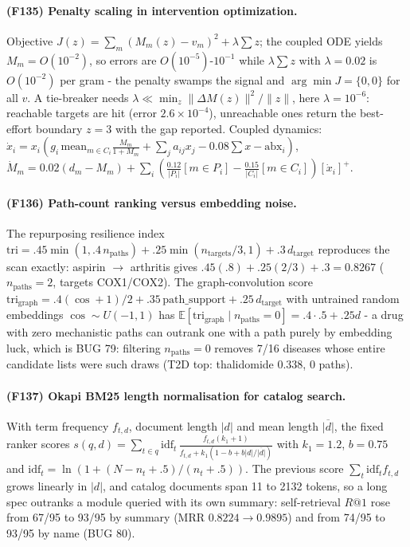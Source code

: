 \paragraph{(F135) Penalty scaling in intervention optimization.} Objective $J(z)=\sum_m(M_m(z)-v_m)^2+\lambda\sum z$; the coupled ODE yields $M_m=O(10^{-2})$, so errors are $O(10^{-5})$-$10^{-1}$ while $\lambda\sum z$ with $\lambda=0.02$ is $O(10^{-2})$ per gram - the penalty swamps the signal and $\arg\min J=\{0,0\}$ for all $v$. A tie-breaker needs $\lambda\ll\min_z\|\Delta M(z)\|^2/\|z\|$, here $\lambda=10^{-6}$: reachable targets are hit (error $2.6\times10^{-4}$), unreachable ones return the best-effort boundary $z=3$ with the gap reported. Coupled dynamics: $\dot x_i=x_i(g_i\,\mathrm{mean}_{m\in C_i}\tfrac{M_m}{1+M_m}+\sum_j a_{ij}x_j-0.08\sum x-\mathrm{abx}_i)$, $\dot M_m=0.02(d_m-M_m)+\sum_i(\tfrac{0.12}{|P_i|}[m\in P_i]-\tfrac{0.15}{|C_i|}[m\in C_i])[\dot x_i]^+$.
\paragraph{(F136) Path-count ranking versus embedding noise.} The repurposing resilience index $\mathrm{tri}=.45\min(1,.4\,n_{\mathrm{paths}})+.25\min(n_{\mathrm{targets}}/3,1)+.3\,d_{\mathrm{target}}$ reproduces the scan exactly: aspirin $\to$ arthritis gives $.45(.8)+.25(2/3)+.3=0.8267$ ($n_{\mathrm{paths}}=2$, targets COX1/COX2). The graph-convolution score $\mathrm{tri}_{\mathrm{graph}}=.4(\cos+1)/2+.35\,\mathrm{path\_support}+.25\,d_{\mathrm{target}}$ with untrained random embeddings $\cos\sim U(-1,1)$ has $\mathbb{E}[\mathrm{tri}_{\mathrm{graph}}\mid n_{\mathrm{paths}}=0]=.4\cdot.5+.25d$ - a drug with zero mechanistic paths can outrank one with a path purely by embedding luck, which is BUG 79: filtering $n_{\mathrm{paths}}=0$ removes 7/16 diseases whose entire candidate lists were such draws (T2D top: thalidomide $0.338$, 0 paths).
\paragraph{(F137) Okapi BM25 length normalisation for catalog search.} With term frequency $f_{t,d}$, document length $|d|$ and mean length $\overline{|d|}$, the fixed ranker scores $s(q,d)=\sum_{t\in q}\mathrm{idf}_t\,\frac{f_{t,d}(k_1+1)}{f_{t,d}+k_1(1-b+b|d|/\overline{|d|})}$ with $k_1=1.2$, $b=0.75$ and $\mathrm{idf}_t=\ln(1+(N-n_t+.5)/(n_t+.5))$. The previous score $\sum_t \mathrm{idf}_t f_{t,d}$ grows linearly in $|d|$, and catalog documents span 11 to 2132 tokens, so a long spec outranks a module queried with its own summary: self-retrieval $R@1$ rose from 67/95 to 93/95 by summary (MRR $0.8224\to0.9895$) and from 74/95 to 93/95 by name (BUG 80).
